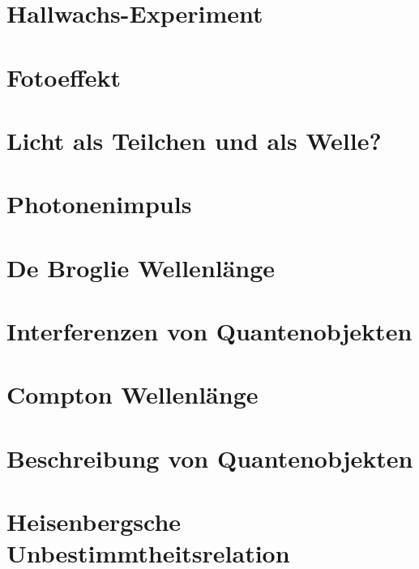 \section{Hallwachs-Experiment} \label{sec:hallwachs}


\section{Fotoeffekt} \label{sec:fotoeffekt}


\section{Licht als Teilchen und als Welle?} \label{sec:lichtteilchenwelle}


\section{Photonenimpuls} \label{sec:photonenimpuls}


\section{De Broglie Wellenlänge} \label{sec:debroglie}


\section{Interferenzen von Quantenobjekten} \label{sec:interferenzenquanten}


\section{Compton Wellenlänge} \label{sec:compton}


\section{Beschreibung von Quantenobjekten} \label{sec:beschreibungquanten}


\section{Heisenbergsche Unbestimmtheitsrelation} \label{sec:unbestimmtheitsrelation}


